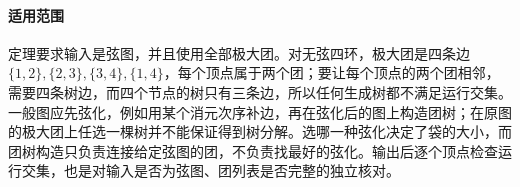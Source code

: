\paragraph{适用范围}
定理要求输入是弦图，并且使用全部极大团。对无弦四环，极大团是四条边$\{1,2\},\allowbreak\{2,3\},\allowbreak\{3,4\},\allowbreak\{1,4\}$，每个顶点属于两个团；要让每个顶点的两个团相邻，需要四条树边，而四个节点的树只有三条边，所以任何生成树都不满足运行交集。一般图应先弦化，例如用某个消元次序补边，再在弦化后的图上构造团树；在原图的极大团上任选一棵树并不能保证得到树分解。选哪一种弦化决定了袋的大小，而团树构造只负责连接给定弦图的团，不负责找最好的弦化。输出后逐个顶点检查运行交集，也是对输入是否为弦图、团列表是否完整的独立核对。
